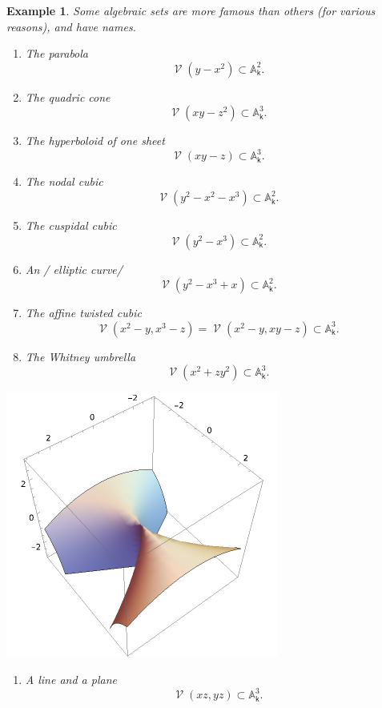 \documentclass[11pt]{article}
\newcommand{\A}{\mathbb{A}}
\renewcommand{\k}{\mathsf{k}}
\DeclareMathOperator{\V}{\mathcal{V}}
\newcommand{\A}{\mathbb A}
\renewcommand{\k}{\mathsf{k}}
\newtheorem{eg}{Example}[section]
\begin{document}
\begin{eg}
Some algebraic sets are more famous than others (for various reasons), and have names.
\begin{enumerate}
\item The \emph{parabola} \[\V(y-x^{2}) \subset \A^{2}_{\k}.\]
\item The \emph{quadric cone} \[\V(xy-z^2) \subset \A^3_{\k}.\]
\item The \emph{hyperboloid of one sheet} \[\V(xy-z) \subset \A^{3}_{\k}.\]
\item The \emph{nodal cubic} \[\V(y^2 - x^{2}-x^{3}) \subset \A^2_{\k}.\]
\item The \emph{cuspidal cubic} \[\V(y^2-x^3) \subset \A^2_{\k}.\]
\item An / elliptic curve/ \[\V(y^2-x^3+x) \subset \A^2_{\k}.\]
\item The \emph{affine twisted cubic} \[\V(x^2-y,x^3-z) = \V(x^2-y, xy-z) \subset \A^3_{\k}.\]
\item The \emph{Whitney umbrella} \[\V(x^2+zy^2) \subset \A^{3}_{\k}.\]
\end{enumerate}

\begin{center}
\includegraphics[width=.9\linewidth]{./images/whitney2.png}
\end{center}

\begin{enumerate}
\item A \emph{line and a plane}  \[\V(xz,yz) \subset \A^3_{\k}.\]
\end{enumerate}
\end{eg}
\end{document}

